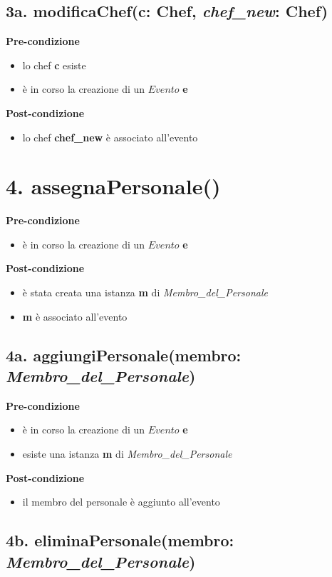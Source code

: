 \documentclass[12pt]{extarticle}
\begin{document}
\subsection*{3a. modificaChef(c: Chef, \textit{chef\_new}: Chef)}

\textbf{Pre-condizione}
\begin{itemize}
  \item lo chef \textbf{c} esiste
  \item è in corso la creazione di un $Evento$ \textbf{e}
\end{itemize}
\textbf{Post-condizione}
\begin{itemize}
  \item lo chef \textbf{chef\_new} è associato all'evento
\end{itemize}


\section*{4. assegnaPersonale()}

\textbf{Pre-condizione}
\begin{itemize}
  \item è in corso la creazione di un $Evento$ \textbf{e}
\end{itemize}
\textbf{Post-condizione}
\begin{itemize}
  \item è stata creata una istanza \textbf{m} di \textit{Membro\_del\_Personale}
  \item \textbf{m} è associato all'evento
\end{itemize}


\subsection*{4a. aggiungiPersonale(membro: \textit{Membro\_del\_Personale})}

\textbf{Pre-condizione}
\begin{itemize}
  \item è in corso la creazione di un $Evento$ \textbf{e}
  \item esiste una istanza \textbf{m} di \textit{Membro\_del\_Personale}
\end{itemize}
\textbf{Post-condizione}
\begin{itemize}
  \item il membro del personale è aggiunto all'evento
\end{itemize}


\subsection*{4b. eliminaPersonale(membro: \textit{Membro\_del\_Personale})}
\end{document}
